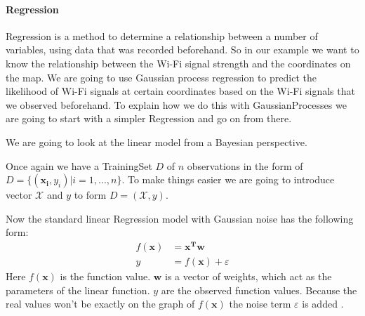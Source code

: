 \paragraph{Regression}
\Gls{Regression} is a method to determine a relationship between a number of variables, using data that was recorded beforehand. So in our example we want to know the relationship between the Wi-Fi signal strength and the coordinates on the map. 
We are going to use Gaussian process regression to predict the likelihood of Wi-Fi signals at certain coordinates based on the Wi-Fi signals that we observed beforehand. To explain how we do this with \Gls{GaussianProcess}es we are going to start with a simpler \gls{Regression} and go on from there. 

We are going to look at the linear model from a Bayesian perspective. 

Once again we have a \gls{TrainingSet} $D$ of $n$ observations in the form of $D = \{(\mathbf{x_i},y_i)|i=1,...,n\}$. To make things easier we are going to introduce vector $\mathcal{X}$ and $y$ to form $D = (\mathcal{X},y)$.

Now the standard linear \gls{Regression} model with Gaussian noise has the following form:
\begin{equation}\label{linearmodel}
\begin{aligned}
f(\mathbf{x}) &= \mathbf{x^T}\mathbf{w}\\
y &= f(\mathbf{x}) + \varepsilon
\end{aligned}
\end{equation}
Here $f(\mathbf{x})$ is the function value. $\mathbf{w}$ is a vector of weights, which act as the parameters of the linear function. $y$ are the observed function values. Because the real values won't be exactly on the graph of $f(\mathbf{x})$ the noise term $\varepsilon$ is added \citep[p.\ 8]{Rasmussen:2005:GPM:1162254}. 

